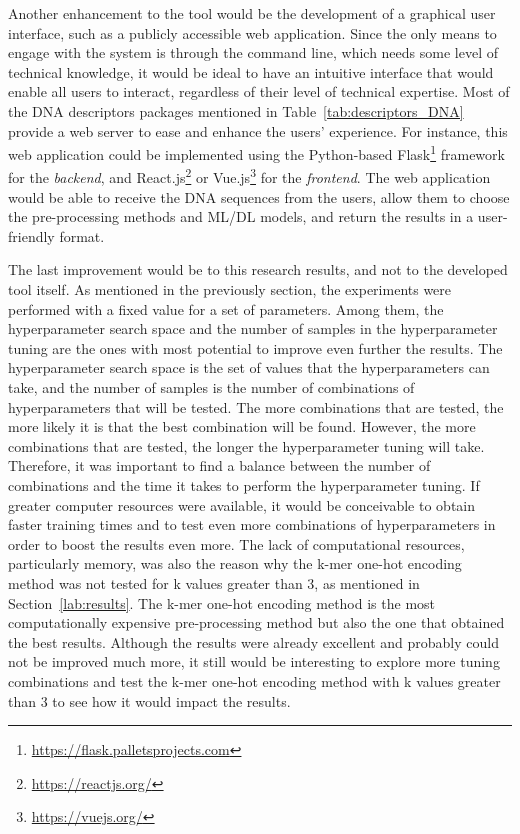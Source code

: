 Another enhancement to the tool would be the development of a graphical user interface, such as a publicly accessible web application. Since the only means to engage with the system is through the command line, which needs some level of technical knowledge, it would be ideal to have an intuitive interface that would enable all users to interact, regardless of their level of technical expertise. Most of the \gls{DNA} descriptors packages mentioned in Table~\ref{tab:descriptors_DNA} provide a web server to ease and enhance the users' experience. For instance, this web application could be implemented using the Python-based Flask\footnote{\href{https://flask.palletsprojects.com/en/2.2.x/}{https://flask.palletsprojects.com}} framework for the \textit{backend}, and React.js\footnote{\href{https://reactjs.org/}{https://reactjs.org/}} or Vue.js\footnote{\href{https://vuejs.org/}{https://vuejs.org/}} for the \textit{frontend}. The web application would be able to receive the \gls{DNA} sequences from the users, allow them to choose the pre-processing methods and \gls{ML}/\gls{DL} models, and return the results in a user-friendly format.

The last improvement would be to this research results, and not to the developed tool itself. As mentioned in the previously section, the experiments were performed with a fixed value for a set of parameters. Among them, the hyperparameter search space and the number of samples in the hyperparameter tuning are the ones with most potential to improve even further the results. The hyperparameter search space is the set of values that the hyperparameters can take, and the number of samples is the number of combinations of hyperparameters that will be tested. The more combinations that are tested, the more likely it is that the best combination will be found. However, the more combinations that are tested, the longer the hyperparameter tuning will take. Therefore, it was important to find a balance between the number of combinations and the time it takes to perform the hyperparameter tuning. If greater computer resources were available, it would be conceivable to obtain faster training times and to test even more combinations of hyperparameters in order to boost the results even more. The lack of computational resources, particularly memory, was also the reason why the k-mer one-hot encoding method was not tested for k values greater than 3, as mentioned in Section~\ref{lab:results}. The k-mer one-hot encoding method is the most computationally expensive pre-processing method but also the one that obtained the best results. Although the results were already excellent and probably could not be improved much more, it still would be interesting to explore more tuning combinations and test the k-mer one-hot encoding method with k values greater than 3 to see how it would impact the results.